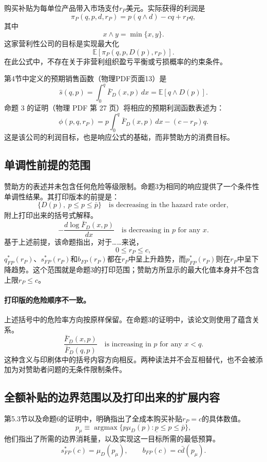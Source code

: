 \documentclass{article}
\begin{document}
购买补贴为每单位产品带入市场支付$r_P$美元。实际获得的利润是
\begin{equation}
\pi_P(q,p,d,r_P)=p(q\wedge d)-cq+r_Pq,
\tag{1}
\end{equation}
其中
\[
x\wedge y=\min\{x,y\}.
\]
这家营利性公司的目标是实现最大化
\[
\mathbb E[\pi_P(q,p,D(p),r_P)].
\]
在此公式中，不存在关于非营利组织盈亏平衡或亏损概率的约束条件。

第4节中定义的预期销售函数（物理PDF页面13）是
\[
\hat s(q,p)=\int_0^q\bar F_D(x,p)\,dx
           =\mathbb E[q\wedge D(p)].
\]
命题 3 的证明（物理 PDF 第 27 页）将相应的预期利润函数表述为：
\[
\phi(p,q,r_P)=p\int_0^q\bar F_D(x,p)\,dx-(c-r_P)q.
\]
这是该公司的利润目标，也是响应公式的基础，而非赞助方的消费目标。

\subsection*{单调性前提的范围}

赞助方的表述并未包含任何危险等级限制。命题3为相同的响应提供了一个条件性单调性结果。其打印版本的前提是：
\[
\{D(p),\ \underline p\leq p\leq\bar p\}
\quad\text{is decreasing in the hazard rate order},
\]
附上打印出来的括号式解释。
\[
-\frac{d\log\bar F_D(x,p)}{dx}
\quad\text{is decreasing in $p$ for any $x$}.
\]
基于上述前提，该命题指出，对于……来说，
\[
0\leq r_P\leq c,
\]
$q_{FP}^{*}(r_P)$、$s_{FP}^{*}(r_P)$和$b_{FP}(r_P)$都在$r_P$中呈上升趋势，而$p_{FP}^{*}(r_P)$则在$r_P$中呈下降趋势。这个范围就是命题3的打印范围；赞助方所显示的最大化值本身并不包含上限$r_P\leq c$。

\paragraph{打印版的危险顺序不一致。}
上述括号中的危险率方向按原样保留。在命题3的证明中，该论文则使用了蕴含关系。
\[
\frac{\bar F_D(x,p)}{\bar F_D(q,p)}
\quad\text{is increasing in $p$ for any $x<q$}.
\]
这种含义与印刷体中的括号内容方向相反。两种读法并不会互相替代，也不会被添加为对赞助者问题的无条件限制条件。

\subsection*{全额补贴的边界范围以及打印出来的扩展内容}

第5.3节以及命题6的证明中，明确指出了全成本购买补贴$r_P=c$的具体数值。
\[
p_\mu\equiv\operatorname*{argmax}
\{p\mu_D(p):\underline p\leq p\leq\bar p\},
\]
他们指出了所需的边界消耗量，以及实现这一目标所需的最低预算。
\[
s_{FP}^{*}(c)=\mu_D(p_\mu),\qquad
b_{FP}(c)=c\bar d(p_\mu).
\]
\end{document}
